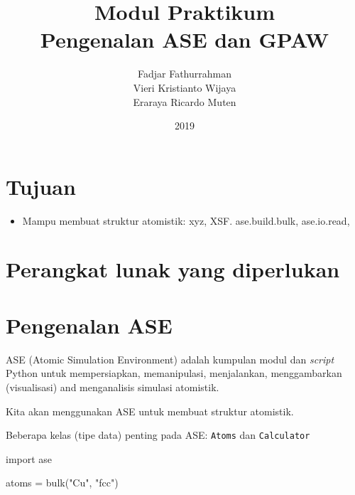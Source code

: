 \documentclass[a4paper,11pt]{extarticle}
\newcommand{\pyinline}[1]{\texttt{#1}}
\begin{document}
\title{
Modul Praktikum \\
Pengenalan \textsf{ASE} dan \textsf{GPAW}}
\author{Fadjar Fathurrahman\\
Vieri Kristianto Wijaya\\
Eraraya Ricardo Muten}
\date{2019}
\maketitle

\section{Tujuan}
\begin{itemize}
\item Mampu membuat struktur atomistik: xyz, XSF. ase.build.bulk, ase.io.read,
\end{itemize}

\section{Perangkat lunak yang diperlukan}


\section{Pengenalan \textsf{ASE}}

\textsf{ASE} (Atomic Simulation Environment) adalah kumpulan modul dan \textit{script} Python untuk
mempersiapkan, memanipulasi, menjalankan, menggambarkan (visualisasi) and menganalisis simulasi
atomistik.

Kita akan menggunakan \textsf{ASE} untuk membuat struktur atomistik.

Beberapa kelas (tipe data) penting pada \textsf{ASE}: \pyinline{Atoms} dan \pyinline{Calculator}

\begin{pythoncode}
import ase

atoms = bulk("Cu", "fcc")
\end{pythoncode}
\end{document}
